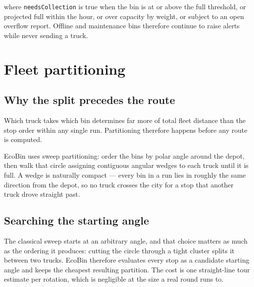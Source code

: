 \documentclass[11pt,a4paper]{article}
\begin{document}
where \texttt{needsCollection} is true when the bin is at or above the
full threshold, or projected full within the hour, or over capacity by
weight, or subject to an open overflow report. Offline and maintenance
bins therefore continue to raise alerts while never sending a truck.

\section{Fleet partitioning}

\subsection{Why the split precedes the route}

Which truck takes which bin determines far more of total fleet distance
than the stop order within any single run. Partitioning therefore happens
before any route is computed.

EcoBin uses sweep partitioning: order the bins by polar angle around the
depot, then walk that circle assigning contiguous angular wedges to each
truck until it is full. A wedge is naturally compact --- every bin in a
run lies in roughly the same direction from the depot, so no truck
crosses the city for a stop that another truck drove straight past.

\subsection{Searching the starting angle}

The classical sweep starts at an arbitrary angle, and that choice
matters as much as the ordering it produces: cutting the circle through a
tight cluster splits it between two trucks. EcoBin therefore evaluates
every stop as a candidate starting angle and keeps the cheapest resulting
partition. The cost is one straight-line tour estimate per rotation,
which is negligible at the size a real round runs to.
\end{document}
